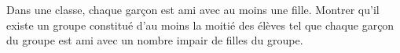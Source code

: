 Dans une classe, chaque garçon est ami avec au moins une fille. Montrer qu'il existe un groupe constitué d'au moins la moitié des élèves tel que chaque garçon du groupe est ami avec un nombre impair de filles du groupe.
